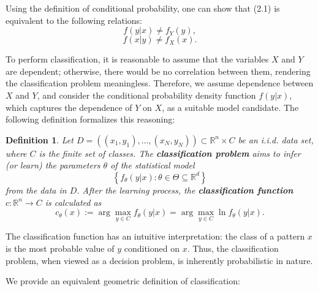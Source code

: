 \documentclass{report}
\newtheorem{definition}{Definition}[chapter]
\begin{document}
Using the definition of conditional probability, one can show that (2.1) is equivalent to the following relations:
\begin{equation}
f(y|x) \neq f_Y(y),
\end{equation}
\begin{equation}
f(x|y) \neq f_X(x).
\end{equation}

To perform classification, it is reasonable to assume that the variables $X$ and $Y$ are dependent; otherwise, there would be no correlation between them, rendering the classification problem meaningless. Therefore, we assume dependence between $X$ and $Y$, and consider the conditional probability density function $f(y|x)$, which captures the dependence of $Y$ on $X$, as a suitable model candidate. The following definition formalizes this reasoning:

\begin{definition}
Let $D = ((x_1,y_1),\dots,(x_N,y_N)) \subset \mathbb{R}^n\times C$ be an i.i.d. data set, where $C$ is the finite set of classes. The \textbf{classification problem} aims to infer (or learn) the parameters $\theta$ of the statistical model
\begin{equation}
\left\{f_\theta(y|x) : \theta \in \Theta \subseteq \mathbb{R}^d\right\}
\end{equation}
from the data in $D$. After the learning process, the \textbf{classification function} $c : \mathbb{R}^n \to C$ is calculated as
\begin{equation}
 c_\theta(x) := \arg\max_{y\in C}f_\theta(y|x) = \arg\max_{y\in C}\ln f_\theta(y|x).
\end{equation}
\end{definition}

The classification function has an intuitive interpretation: the class of a pattern $x$ is the most probable value of $y$ conditioned on $x$. Thus, the classification problem, when viewed as a decision problem, is inherently probabilistic in nature.

We provide an equivalent geometric definition of classification:
\end{document}
